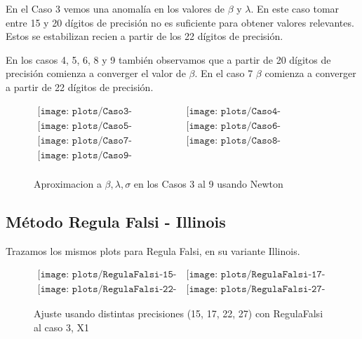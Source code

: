 En el Caso 3 vemos una anomal\'ia en los valores de $\beta$ y $\lambda$. En este caso tomar entre 15 y 20 d\'igitos de precisi\'on no es suficiente para obtener valores relevantes. Estos se estabilizan recien a partir de los 22 d\'igitos de precisi\'on.


En los casos 4, 5, 6, 8 y 9 tambi\'en observamos que a partir de 20 d\'igitos de precisi\'on comienza a converger el valor de $\beta$. En el caso 7 $\beta$ comienza a converger a partir de 22 d\'igitos de precisi\'on.

\begin{figure}
$\begin{array}{cc}
\texttt{[image: plots/Caso3-Newton.png]} &
\texttt{[image: plots/Caso4-Newton.png]} \\
\texttt{[image: plots/Caso5-Newton.png]} &
\texttt{[image: plots/Caso6-Newton.png]} \\
\texttt{[image: plots/Caso7-Newton.png]} &
\texttt{[image: plots/Caso8-Newton.png]} \\
\texttt{[image: plots/Caso9-Newton.png]} &\\
\end{array}$

\caption{Aproximacion a $\beta, \lambda, \sigma$ en los Casos 3 al 9 usando Newton}
\label{fig:AproxCasosNewton}
\end{figure}

\subsection{M\'etodo Regula Falsi - Illinois}


Trazamos los mismos plots para Regula Falsi, en su variante Illinois.

\begin{figure} [H]
$\begin{array}{cc}
\texttt{[image: plots/RegulaFalsi-15-caso3.png]} &
\texttt{[image: plots/RegulaFalsi-17-caso3.png]} \\
\texttt{[image: plots/RegulaFalsi-22-caso3.png]} &
\texttt{[image: plots/RegulaFalsi-27-caso3.png]}
\end{array}$
\caption{Ajuste usando distintas precisiones (15, 17, 22, 27) con RegulaFalsi al caso 3, X1}
\label{fig:FitCaso3RegulaFalsi}
\end{figure}

